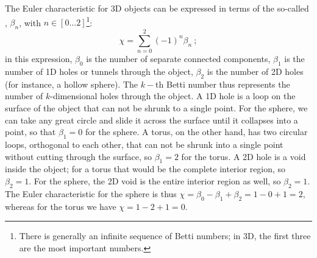 The Euler characteristic for 3D objects can be expressed in terms of the so-called , $\beta_n$, with $n\in[0\ldots 2]$\footnote{There is generally an infinite sequence of Betti numbers; in 3D, the first three are the most important numbers.}:
\begin{equation}
	\chi = \sum_{n=0}^2 (-1)^n \beta_n\ ;\label{\chabbr:eq:Betti}
\end{equation}
in this expression, $\beta_0$ is the number of separate connected components, $\beta_1$ is the number of 1D holes or tunnels through the object, $\beta_2$ is the number of 2D holes (for instance, a hollow sphere).  The $k-$th Betti number thus represents the number of $k$-dimensional holes through the object.  A 1D hole is a loop on the surface of the object that can not be shrunk to a single point. For the sphere, we can take any great circle and slide it across the surface until it collapses into a point, so that $\beta_1=0$ for the sphere. A torus, on the other hand, has two circular loops, orthogonal to each other, that can not be shrunk into a single point without cutting through the surface, so $\beta_1=2$ for the torus. A 2D hole is a void inside the object; for a torus that would be the complete interior region, so $\beta_2=1$. For the sphere, the 2D void is the entire interior region as well, so $\beta_2=1$.  The Euler characteristic for the sphere is thus $\chi=\beta_0-\beta_1+\beta_2=1-0+1=2$, whereas for the torus we have $\chi=1-2+1=0$.


